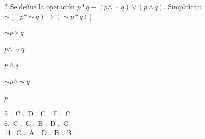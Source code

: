 \begin{multicols}{2}
\ejercicio Se define la operación
$p \ast q \equiv (p \wedge \sim q) \vee (p \wedge q)$.
Simplificar: $\sim[(p \ast \sim q) \rightarrow (\sim p \ast q)]$
\begin{alternativas}
  \item $\sim p \vee q$
  \item $p \wedge \sim q$
  \item $p \wedge q$
  \item $\sim p \wedge \sim q$
  \item $p$
\end{alternativas}
\vspace{0.3cm}

\end{multicols}

\vspace{0.5cm}
\begin{tcolorbox}[
  enhanced, colback=GrisClaro, colframe=GrisMedio,
  arc=2pt, boxrule=0.5pt,
  fonttitle=\sffamily\bfseries\small\color{GrisCarbón},
  title={Clave de Respuestas}
]
\small\sffamily
\begin{multicols}{5}
.~C .~D .~C .~E .~C \\
6.~C .~C .~B .~D .~C \\
11.~C .~A .~D .~B .~B
\end{multicols}
\end{tcolorbox}

